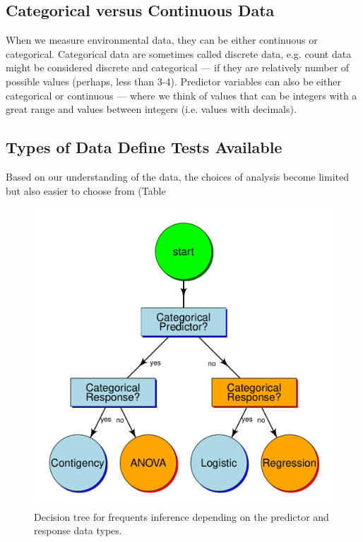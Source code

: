 \documentclass{article}\usepackage[]{graphicx}\usepackage[]{color}
\makeatletter
\def\maxwidth{ %
  \ifdim\Gin@nat@width>\linewidth
    \linewidth
  \else
    \Gin@nat@width
  \fi
}
\newenvironment{knitrout}{}{} %
\makeatother
\begin{document}
\subsection{Categorical versus Continuous Data}

When we measure environmental data, they can be either continuous or categorical. Categorical data are sometimes called discrete data, e.g. count data might be considered discrete and categorical --- if they are relatively number of possible values (perhaps, less than 3-4). Predictor variables can also be either categorical or continuous --- where we think of values that can be integers with a great range and values between integers (i.e. values with decimals).

\subsection{Types of Data Define Tests Available}

Based on our understanding of the data, the choices of analysis become limited but also easier to choose from (Table %

\begin{figure}
\caption{Decision tree for frequents inference depending on the predictor and response data types.}\label{fig:tree}
\begin{center}
\begin{knitrout}
\color{fgcolor}
\includegraphics[width=\maxwidth]{figure/unnamed-chunk-3-1} 

\end{knitrout}
\end{center}
\end{figure}
\end{document}
